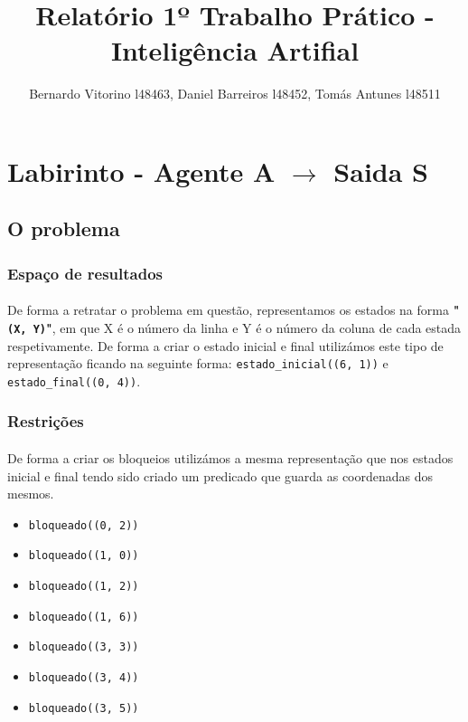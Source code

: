\documentclass{article}
\title{Relatório 1º Trabalho Prático - Inteligência Artifial}
\author{Bernardo Vitorino l48463, Daniel Barreiros l48452, Tomás Antunes l48511}
\begin{document}
\maketitle

\section{Labirinto - Agente A $\rightarrow$ Saida S}
\subsection{O problema}
\subsubsection{Espaço de resultados}

\paragraph{}De forma a retratar o problema em questão, representamos os estados na forma \textbf{"\texttt{(X, Y)}"}, em que X é o número da linha e Y é o número da coluna de cada estada respetivamente. De forma a criar o estado inicial e final utilizámos este tipo de representação ficando na seguinte forma: \texttt{estado\_inicial((6, 1))} e \texttt{estado\_final((0, 4))}.

\subsubsection{Restrições}
\paragraph{} De forma a criar os bloqueios utilizámos a mesma representação que nos estados inicial e final tendo sido criado um predicado que guarda as coordenadas dos mesmos. 

\begin{itemize}
  \item \texttt{bloqueado((0, 2))}
  \item \texttt{bloqueado((1, 0))}
  \item \texttt{bloqueado((1, 2))}
  \item \texttt{bloqueado((1, 6))}
  \item \texttt{bloqueado((3, 3))}
  \item \texttt{bloqueado((3, 4))}
  \item \texttt{bloqueado((3, 5))}
\end{itemize}
\end{document}

